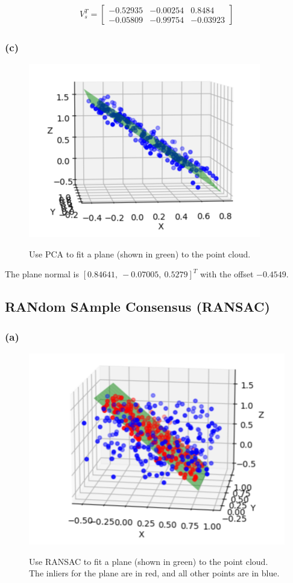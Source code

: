 \documentclass{article}
\theoremstyle{definition} %
\begin{document}
\begin{align*}
	V_s^T = 
	\begin{bmatrix}
		-0.52935 & -0.00254 & 0.8484\\
		-0.05809 & -0.99754 & -0.03923
	\end{bmatrix}
\end{align*}


\subsubsection*{(c)}
\begin{figure}[H]
    \centering
        \textsf{\includegraphics[width=0.6\columnwidth]{pca_plane_fitting.png}}
        \caption{Use PCA to fit a plane (shown in green) to the point cloud.}
        \label{fig:pca_plane}
\end{figure}

The plane normal is $[0.84641,\ -0.07005,\ 0.5279]^T$ with the offset $-0.4549$.


\subsection*{RANdom SAmple Consensus (RANSAC)}

\subsubsection*{(a)}
\begin{figure}[H]
    \centering
        \textsf{\includegraphics[width=0.6\columnwidth]{ransac_plane_fitting.png}}
        \caption{Use RANSAC to fit a plane (shown in green) to the point cloud. The inliers for the plane are in red, and all other points are in blue.}
        \label{fig:ransac_plane}
\end{figure}
\end{document}
